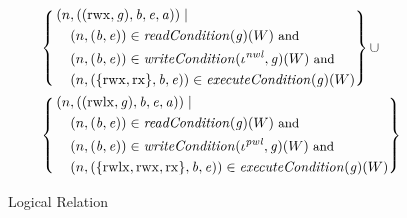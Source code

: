 \documentclass[compsoc,conference,letterpaper,fleqn]{IEEEtran}
\newcommand{\union}{\mathbin{\cup}}
\newcommand{\var}[1]{\mathit{#1}}
\newcommand{\gl}{\var{g}}
\newcommand{\addr}{\var{a}}
\newcommand{\start}{\var{b}}
\newcommand{\addrend}{\var{e}}
\newcommand{\perm}{\var{perm}}
\newcommand{\stdcap}[1][(\perm,\gl)]{\left(#1,\start,\addrend,\addr \right)}
\newcommand{\nwl}{\var{nwl}}
\newcommand{\pwl}{\var{pwl}}
\newcommand{\plainfun}[2]{
  \ifthenelse{\equal{#2}{}}
  {\mathit{#1}}
  {\mathit{#1}(#2)}
}
\newcommand{\readCond}[1]{\plainfun{readCondition}{#1}}
\newcommand{\writeCond}[1]{\plainfun{writeCondition}{#1}}
\newcommand{\execCond}[1]{\plainfun{executeCondition}{#1}}
\newcommand{\npair}[2][n]{\left(#1,#2 \right)}
\newcommand{\plainperm}[1]{\mathrm{#1}}
\newcommand{\exec}{\plainperm{rx}}
\newcommand{\rwx}{\plainperm{rwx}}
\newcommand{\rwlx}{\plainperm{rwlx}}
\newlength{\oldmathindent}
\newenvironment{withmathindent}[1]{\setlength{\oldmathindent}{\mathindent}\setlength{\mathindent}{#1}}{\setlength{\mathindent}{\oldmathindent}}
\begin{document}
{\begin{figure}[htbp]
\begin{withmathindent}{0cm}
\begin{align*}
\begin{aligned}[t]
        & \left\{
          \begin{aligned}
            &\npair{\stdcap[(\rwx,\gl)]} \mid \\
            &\quad\npair{(\start,\addrend)} \in \readCond{}(\gl)(W) \text{\footnotesize{ and }} \\
            &\quad\npair{(\start,\addrend)} \in \writeCond{}(\iota^\nwl,\gl)(W) \text{\footnotesize{ and }}\\
            &\quad\npair{(\{\rwx,\exec\},\start,\addrend)} \in \execCond{}(\gl)(W)
          \end{aligned} \right\}
        \union \\
        & \left\{
          \begin{aligned}
            &\npair{\stdcap[(\rwlx,\gl)]} \mid \\
             &\quad\npair{(\start,\addrend)} \in \readCond{}(\gl)(W) \text{\footnotesize{ and }} \\
             &\quad\npair{(\start,\addrend)} \in \writeCond{}(\iota^\pwl,\gl)(W) \text{\footnotesize{ and }}\\
             &\quad\npair{(\{\rwlx,\rwx,\exec\},\start,\addrend)} \in
            \execCond{}(\gl)(W)
          \end{aligned} \right\}
      \end{aligned}
    \end{align*}
  \end{withmathindent}
  \caption{Logical Relation}
  \label{fig:logrel}            
\end{figure}


}
\end{document}
